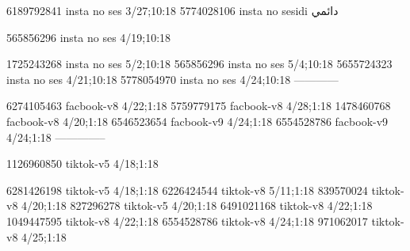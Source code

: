 
6189792841 insta no ses
3/27;10:18
5774028106 insta no sesidi
دائمي

565856296 insta no ses
4/19;10:18

1725243268 insta no ses
5/2;10:18
565856296 insta no ses
5/4;10:18
5655724323 insta no ses
4/21;10:18
5778054970 insta no ses
4/24;10:18
------------

6274105463 facbook-v8
4/22;1:18
5759779175 facbook-v8
4/28;1:18
1478460768 facbook-v8
4/20;1:18
6546523654 facbook-v9
4/24;1:18
6554528786 facbook-v9
4/24;1:18
--------------

1126960850 tiktok-v5
4/18;1:18

6281426198 tiktok-v5
4/18;1:18
6226424544 tiktok-v8
5/11;1:18
839570024 tiktok-v8
4/20;1:18
827296278 tiktok-v5
4/20;1:18
6491021168 tiktok-v8
4/22;1:18
1049447595 tiktok-v8
4/22;1:18
6554528786 tiktok-v8
4/24;1:18
971062017 tiktok-v8
4/25;1:18
